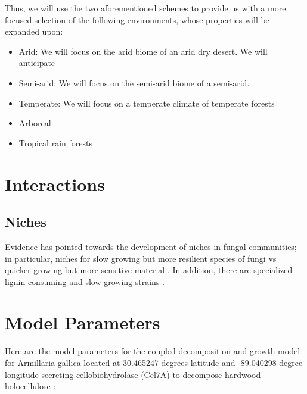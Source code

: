 \documentclass{article}
\begin{document}
Thus, we will use the two aforementioned schemes to provide us with a more focused selection of the following environments, whose properties will be expanded upon:
\begin{itemize}
\item Arid: We will focus on the arid biome of an arid dry desert. We will anticipate

\item Semi-arid: We will focus on the semi-arid biome of a semi-arid. 

\item Temperate: We will focus on a temperate climate of temperate forests

\item Arboreal

\item Tropical rain forests

\end{itemize}

\section{Interactions}

\subsection{Niches}

Evidence has pointed towards the development of niches in fungal communities; in particular, niches for slow growing but more resilient species of fungi vs quicker-growing but more sensitive material \cite{GUIDE ONE****}. In addition, there are specialized lignin-consuming and slow growing strains \cite{Moorhead2006}. 

\section{Model Parameters}

Here are the model parameters for the coupled decomposition and growth model for Armillaria gallica located at 30.465247 degrees latitude and -89.040298 degree longitude secreting cellobiohydrolase (Cel7A) to decompose hardwood holocellulose \cite{Maynard2019} \cite{Kari2014}:
\end{document}
